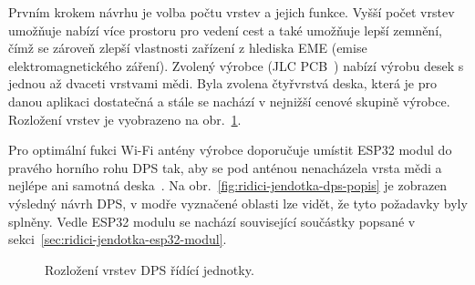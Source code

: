         Prvním krokem návrhu je volba počtu vrstev a jejich funkce. Vyšší počet vrstev umožňuje nabízí více prostoru pro vedení cest a také umožňuje lepší zemnění, čímž se zároveň zlepší vlastnosti zařízení z hlediska EME (emise elektromagnetického záření). Zvolený výrobce (JLC PCB~\cite{jlcpcb}) nabízí výrobu desek s jednou až dvaceti vrstvami mědi. Byla zvolena čtyřvrstvá deska, která je pro danou aplikaci dostatečná a stále se nachází v nejnižší cenové skupině výrobce. Rozložení vrstev je vyobrazeno na obr.~\ref{fig:ridici-jednotka-stackup-dps}.

        Pro optimální fukci Wi-Fi antény výrobce doporučuje umístit ESP32 modul do pravého horního rohu DPS tak, aby se pod anténou nenacházela vrsta mědi a nejlépe ani samotná deska~\cite{esp32-hw-guidelines}. Na obr.~\ref{fig:ridici-jendotka-dps-popis} je zobrazen výsledný návrh DPS, v modře vyznačené oblasti lze vidět, že tyto požadavky byly splněny. Vedle ESP32 modulu se nachází související součástky popsané v sekci~\ref{sec:ridici-jendotka-esp32-modul}.

        \begin{figure}[h!]
            \centering
            \caption{Rozložení vrstev DPS řídící jednotky.}
            \label{fig:ridici-jednotka-stackup-dps}
        \end{figure}


